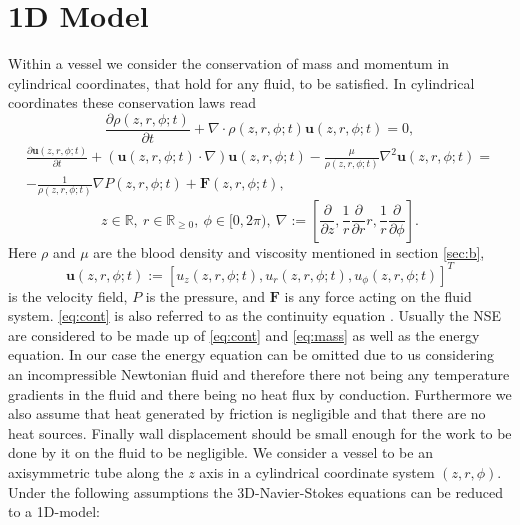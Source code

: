 \documentclass[a4paper, oneside]{discothesis}
\begin{document}
\section{1D Model} \label{sec:sv}
Within a vessel we consider the conservation of mass and momentum in cylindrical coordinates, that hold for any fluid, to be satisfied.
In cylindrical coordinates these conservation laws read
\begin{equation}
	\frac{\partial \rho (z,r,\phi; t)}{\partial t} + \nabla \cdot \rho (z,r,\phi; t)\mathbf{u}(z,r,\phi; t) = 0, \label{eq:cont}
\end{equation}
\begin{multline}
	\frac{\partial \mathbf{u}(z,r,\phi; t)}{\partial t} + \left( \mathbf{u}(z,r,\phi; t) \cdot \nabla \right) \mathbf{u}(z,r,\phi; t) - \frac{\mu}{\rho(z,r,\phi; t)} \nabla^2 \mathbf{u}(z,r,\phi; t) = \\
														- \frac{1}{\rho (z,r,\phi; t)} \nabla P(z,r,\phi; t) + \mathbf{F}(z,r,\phi; t), \label{eq:mass} 
\end{multline}
\begin{equation}
	z \in \mathbb{R}, \ r \in \mathbb{R}_{\geq 0}, \ \phi \in [0, 2\pi), \ \nabla := \left[\frac{\partial}{\partial z}, \frac{1}{r}\frac{\partial}{\partial r}r, \frac{1}{r}\frac{\partial}{\partial \phi}  \right].
\end{equation}
Here $\rho$ and $\mu$ are the blood density and viscosity mentioned in section \ref{sec:b}, 
\begin{equation}
	\mathbf{u}(z,r,\phi; t) := \left[ u_z(z,r,\phi; t), u_r(z,r,\phi; t), u_\phi (z,r,\phi; t) \right]^T
\end{equation}
is the velocity field, $P$ is the pressure, and $\mathbf{F}$ is any force acting on the fluid system.
\autoref{eq:cont} is also referred to as the continuity equation \cite{anderson2011ebook}.
Usually the NSE are considered to be made up of \autoref{eq:cont} and \autoref{eq:mass} as well as the energy equation.
In our case the energy equation can be omitted due to us considering an incompressible Newtonian fluid and therefore there not being any temperature gradients in the fluid and there being no heat flux by conduction.
Furthermore we also assume that heat generated by friction is negligible and that there are no heat sources.
Finally wall displacement should be small enough for the work to be done by it on the fluid to be negligible. 
We consider a vessel to be an axisymmetric tube along the $z$ axis in a cylindrical coordinate system $\left(z,r,\phi\right)$.
Under the following assumptions the 3D-Navier-Stokes equations can be reduced to a 1D-model:
\end{document}
